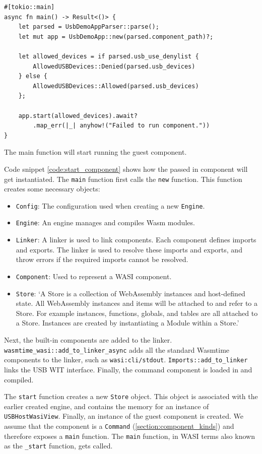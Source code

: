 \begin{code}
\begin{verbatim}
#[tokio::main]
async fn main() -> Result<()> {
	let parsed = UsbDemoAppParser::parse();
	let mut app = UsbDemoApp::new(parsed.component_path)?;

	let allowed_devices = if parsed.usb_use_denylist {
		AllowedUSBDevices::Denied(parsed.usb_devices)
	} else {
		AllowedUSBDevices::Allowed(parsed.usb_devices)
	};

	app.start(allowed_devices).await?
		.map_err(|_| anyhow!("Failed to run component."))
}
\end{verbatim}
\caption{The main function will start running the guest component.}
\label{code:main}
\end{code}

Code snippet \ref{code:start_component} shows how the passed in component will get instantiated. The \texttt{main} function first calls the \texttt{new} function. This function creates some necessary objects: 
\begin{itemize}
\item \texttt{Config}: The configuration used when creating a new \texttt{Engine}.
\item \texttt{Engine}: An engine manages and compiles Wasm modules.
\item \texttt{Linker}: A linker is used to link components. Each component defines imports and exports. The linker is used to resolve these imports and exports, and throw errors if the required imports cannot be resolved.
\item \texttt{Component}: Used to represent a \acrshort{WASI} component.
\item \texttt{Store}: `A Store is a collection of WebAssembly instances and host-defined state.
All WebAssembly instances and items will be attached to and refer to a Store. For example instances, functions, globals, and tables are all attached to a Store. Instances are created by instantiating a Module within a Store.' \cite{wasmtime_store}
\end{itemize}

Next, the built-in components are added to the linker. \texttt{wasmtime\_wasi::add\_to\_linker\_async} adds all the standard Wasmtime components to the linker, such as \texttt{wasi:cli/stdout}. \texttt{Imports::add\_to\_linker} links the USB \acrshort{WIT} interface. Finally, the command component is loaded in and compiled.

The \texttt{start} function creates a new \texttt{Store} object. This object is associated with the earlier created engine, and contains the memory for an instance of \texttt{USBHostWasiView}. Finally, an instance of the guest component is created. We assume that the component is a \texttt{Command} (\ref{section:component_kinds}) and therefore exposes a \texttt{main} function. The \texttt{main} function, in \acrshort{WASI} terms also known as the \texttt{\_start} function, gets called.\\

